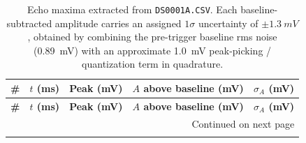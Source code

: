 \documentclass[11pt]{article}
\begin{document}
\small
\begin{longtable}{@{}rrrrr@{}}
\caption{Echo maxima extracted from \texttt{DS0001A.CSV}. Each baseline-subtracted amplitude carries an assigned $1\sigma$ uncertainty of $\pm \SI{1.3}{mV}$, obtained by combining the pre-trigger baseline rms noise (\SI{0.89}{mV}) with an approximate \SI{1.0}{mV} peak-picking / quantization term in quadrature.}\label{tab:maxtable}\\
\toprule
\textbf{\#} & \textbf{$t$ (ms)} & \textbf{Peak (mV)} & \textbf{$A$ above baseline (mV)} & \textbf{$\sigma_A$ (mV)} \\
\midrule
\endfirsthead

\toprule
\textbf{\#} & \textbf{$t$ (ms)} & \textbf{Peak (mV)} & \textbf{$A$ above baseline (mV)} & \textbf{$\sigma_A$ (mV)} \\
\midrule
\endhead

\midrule
\multicolumn{5}{r}{Continued on next page}\\
\endfoot


\end{longtable}
\end{document}
